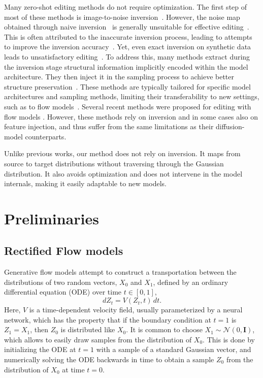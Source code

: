 Many zero-shot editing methods do not require optimization. The first step of most of these methods is image-to-noise inversion~\citep{tumanyan2023plug, hertz2022prompt, huberman2024edit, cao2023masactrl, brack2024leditspp, tsaban2023ledits, wallace2023edict, deutch2024turboedit, wu2023latent, samuel2023regularized}. However, the noise map obtained through naive inversion~\cite{song2020ddim, wu2023latent} is generally unsuitable for effective editing~\cite{huberman2024edit, hertz2022prompt, mokady2023null}. This is often attributed to the inaccurate inversion process, leading to attempts to improve the inversion accuracy~\cite{mokady2023null, han2023improving, wallace2023edict, miyake2023negative}. Yet, even exact inversion on synthetic data leads to unsatisfactory editing~\citep{huberman2024edit}. To address this, many methods extract during the inversion stage structural information implicitly encoded within the model architecture. They then inject it in the sampling process to achieve better structure preservation~\cite{hertz2022prompt, tumanyan2023plug, cao2023masactrl, parmar2023zero, brack2024leditspp}.   
These methods are typically tailored for specific model architectures and sampling methods, limiting their transferability to new settings, such as to flow models~\cite{flux, esser2024scaling}. 
Several recent methods were proposed for editing with flow models \citep{rout2024rfinversion, wang2024taming, avrahami2024stable}. However, these methods rely on inversion and in some cases also on feature injection, and thus suffer from the same limitations as their diffusion-model counterparts.

Unlike previous works, our method does not rely on inversion. It maps from source to target distributions without traversing through the Gaussian distribution. It also avoids optimization and does not intervene in the model internals, making it easily adaptable to new models.

\section{Preliminaries}
\label{pre}

\subsection{Rectified Flow models}
Generative flow models attempt to construct a transportation between the distributions of two random vectors, $X_0$ and $X_1$, defined by an ordinary differential equation (ODE) over time $t\in[0,1]$,
\begin{equation}\label{eq:flow_orig}
    dZ_t=V(Z_t, t) \,dt.
\end{equation}
Here, $V$ is a time-dependent velocity field, usually parameterized by a neural network, which has the property that if the boundary condition at $t=1$ is $Z_1=X_1$,  then $Z_0$ is distributed like $X_0$. It is common to choose $X_1\sim\mathcal{N}(0,\boldsymbol{I})$, which allows to easily draw samples from the distribution of $X_0$. This is done by initializing the ODE at $t=1$ with a sample of a standard Gaussian vector, and numerically solving the ODE backwards in time to obtain a sample $Z_0$ from the distribution of $X_0$ at time $t=0$.

